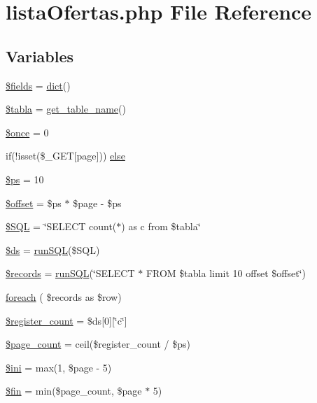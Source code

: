 \hypertarget{lista_ofertas_8php}{}\section{lista\+Ofertas.\+php File Reference}
\label{lista_ofertas_8php}
\subsection*{Variables}
\begin{DoxyCompactItemize}
\item 
\hyperlink{lista_ofertas_8php_ab2303c817e3b402b77b7f99627b9c319}{\$fields} = \hyperlink{dict_8php_a06bc942ddeb3d0d20410b67298781449}{dict}()
\item 
\hyperlink{lista_ofertas_8php_a729c521d99d919a188fcf3ce7ea8abf4}{\$tabla} = \hyperlink{conf_8php_aa6ab823c47bed35ec59f141ad6ae9dd5}{get\+\_\+table\+\_\+name}()
\item 
\hyperlink{lista_ofertas_8php_af9497eccfad417dbeb146a552754ba58}{\$once} = 0
\item 
if(!isset(\$\+\_\+\+G\+ET\mbox{[}\textquotesingle{}page\textquotesingle{}\mbox{]})) \hyperlink{lista_ofertas_8php_a0ac1dc775b5200ca1ce7b5e63b96a90f}{else}
\item 
\hyperlink{lista_ofertas_8php_a8b6b390e5bb7f76108892860e4996a29}{\$ps} = 10
\item 
\hyperlink{lista_ofertas_8php_aec4de82415d7f05cb9748d12d3a95a87}{\$offset} = \$ps $\ast$ \$page -\/ \$ps
\item 
\hyperlink{lista_ofertas_8php_af257545da465befb663591fd6fbe85ce}{\$\+S\+QL} = \char`\"{}S\+E\+L\+E\+CT count($\ast$) as c from \$tabla\char`\"{}
\item 
\hyperlink{lista_ofertas_8php_a1812a4caf64434b22b146b17c25560f2}{\$ds} = \hyperlink{run__sql_8php_a508906286211b4a6c5c393195505b870}{run\+S\+QL}(\$S\+QL)
\item 
\hyperlink{lista_ofertas_8php_a6cb1988642ff4f03fdfb3658cdd14fa0}{\$records} = \hyperlink{run__sql_8php_a508906286211b4a6c5c393195505b870}{run\+S\+QL}(\char`\"{}S\+E\+L\+E\+CT $\ast$ F\+R\+OM \$tabla limit 10 offset \$offset\char`\"{})
\item 
\hyperlink{lista_ofertas_8php_ac5fb0d39759ff645b2b7df05daca83eb}{foreach} ( \$records as \$row)
\item 
\hyperlink{lista_ofertas_8php_a8ac13a7cbfa3465f0b70fc4c1b23ff1a}{\$register\+\_\+count} = \$ds\mbox{[}0\mbox{]}\mbox{[}\char`\"{}c\char`\"{}\mbox{]}
\item 
\hyperlink{lista_ofertas_8php_af8ca4a6d8480351bd32e1b25dcbf9276}{\$page\+\_\+count} = ceil(\$register\+\_\+count / \$ps)
\item 
\hyperlink{lista_ofertas_8php_a8f5f30fbe4092bf20ba2fcae8197ab09}{\$ini} = max(1, \$page -\/ 5)
\item 
\hyperlink{lista_ofertas_8php_aca415ddf942e2a996eb5a5bdeeb7a41f}{\$fin} = min(\$page\+\_\+count, \$page $\ast$ 5)
\end{DoxyCompactItemize}


